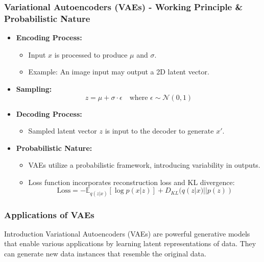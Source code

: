 \documentclass[aspectratio=169]{beamer}
\begin{document}
\begin{frame}[fragile]
    \frametitle{Variational Autoencoders (VAEs) - Working Principle \& Probabilistic Nature}
    \begin{itemize}
        \item \textbf{Encoding Process:} 
        \begin{itemize}
            \item Input \( x \) is processed to produce \( \mu \) and \( \sigma \).
            \item Example: An image input may output a 2D latent vector.
        \end{itemize}

        \item \textbf{Sampling:} 
        \begin{equation}
            z = \mu + \sigma \cdot \epsilon \quad \text{where } \epsilon \sim \mathcal{N}(0, 1)
        \end{equation}

        \item \textbf{Decoding Process:} 
        \begin{itemize}
            \item Sampled latent vector \( z \) is input to the decoder to generate \( x' \).
        \end{itemize}

        \item \textbf{Probabilistic Nature:}
        \begin{itemize}
            \item VAEs utilize a probabilistic framework, introducing variability in outputs.
            \item Loss function incorporates reconstruction loss and KL divergence:
            \begin{equation}
                \text{Loss} = -\mathbb{E}_{q(z|x)}[\log p(x|z)] + D_{KL}(q(z|x) || p(z))
            \end{equation}
        \end{itemize}
    \end{itemize}
\end{frame}

\begin{frame}[fragile]
    \frametitle{Applications of VAEs}
    \begin{block}{Introduction}
        Variational Autoencoders (VAEs) are powerful generative models that enable various applications by learning latent representations of data. They can generate new data instances that resemble the original data.
    \end{block}
\end{frame}
\end{document}
